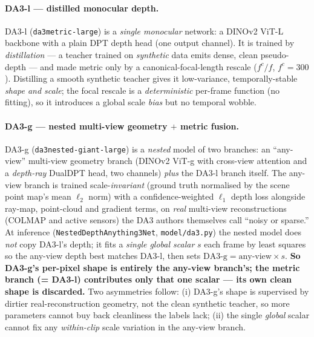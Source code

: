 \documentclass[11pt,a4paper]{article}
\begin{document}
\paragraph{DA3-l --- distilled monocular depth.}
DA3-l (\texttt{da3metric-large}) is a \emph{single monocular} network: a DINOv2 ViT-L backbone with a plain
DPT depth head (one output channel). It is trained by \emph{distillation} --- a teacher trained on
\emph{synthetic} data emits dense, clean pseudo-depth --- and made metric only by a canonical-focal-length
rescale ($f^{c}/f$, $f^{c}{=}300$). Distilling a smooth synthetic teacher gives it low-variance,
temporally-stable \emph{shape and scale}; the focal rescale is a \emph{deterministic} per-frame function (no
fitting), so it introduces a global scale \emph{bias} but no temporal wobble.

\paragraph{DA3-g --- nested multi-view geometry $+$ metric fusion.}
DA3-g (\texttt{da3nested-giant-large}) is a \emph{nested} model of two branches: an ``any-view'' multi-view
geometry branch (DINOv2 ViT-g with cross-view attention and a \emph{depth-ray} DualDPT head, two channels)
\emph{plus} the DA3-l branch itself. The any-view branch is trained scale-\emph{invariant} (ground truth
normalised by the scene point map's mean $\ell_2$ norm) with a confidence-weighted $\ell_1$ depth loss
alongside ray-map, point-cloud and gradient terms, on \emph{real} multi-view reconstructions (COLMAP and
active sensors) the DA3 authors themselves call ``noisy or sparse.'' At inference
(\texttt{NestedDepthAnything3Net}, \texttt{model/da3.py}) the nested model does \emph{not} copy DA3-l's
depth; it fits a \emph{single global scalar} $s$ each frame by least squares so the any-view depth best
matches DA3-l, then sets $\text{DA3-g}=\text{any-view}\times s$.
\textbf{So DA3-g's per-pixel shape is entirely the any-view branch's; the metric branch (= DA3-l) contributes
only that one scalar --- its own clean shape is discarded.} Two asymmetries follow: (i) DA3-g's shape is
supervised by dirtier real-reconstruction geometry, not the clean synthetic teacher, so more parameters
cannot buy back cleanliness the labels lack; (ii) the single \emph{global} scalar cannot fix any
\emph{within-clip} scale variation in the any-view branch.
\end{document}
